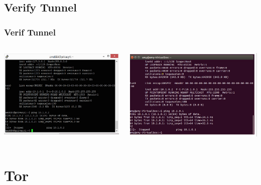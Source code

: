 \documentclass{beamer}
\begin{document}
\subsection{Verify Tunnel}
\begin{frame}
\frametitle{Verif Tunnel}
\begin{columns}
    \begin{column}{0.48\textwidth}
        \includegraphics[width=.9\linewidth]{left}
    \end{column}
    \begin{column}{.5\textwidth}
        \includegraphics[width=.9\linewidth]{right}
    \end{column}
\end{columns}
\end{frame}


\section{Tor}
\end{document}

